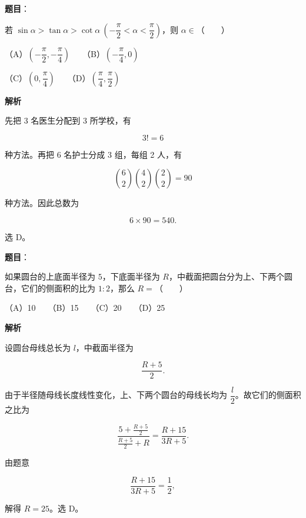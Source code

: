\begin{answer}

\textbf{题目}：

若 $\sin\alpha>\tan\alpha>\cot\alpha\ \left(-\dfrac\pi2<\alpha<\dfrac\pi2\right)$，则 $\alpha\in$\mbox{（　　）}

（A）$\left(-\dfrac\pi2,-\dfrac\pi4\right)$　　（B）$\left(-\dfrac\pi4,0\right)$

（C）$\left(0,\dfrac\pi4\right)$　　（D）$\left(\dfrac\pi4,\dfrac\pi2\right)$

\textbf{解析}

先把 3 名医生分配到 3 所学校，有

\nopagebreak[4]
\[
3!=6
\]

种方法。再把 6 名护士分成 3 组，每组 2 人，有

\nopagebreak[4]
\[
\binom62\binom42\binom22=90
\]

种方法。因此总数为

\nopagebreak[4]
\[
6\times90=540.
\]

选 D。


\end{answer}
\begin{answer}

\textbf{题目}：

如果圆台的上底面半径为 $5$，下底面半径为 $R$，中截面把圆台分为上、下两个圆台，它们的侧面积的比为 $1:2$，那么 $R=$\mbox{（　　）}

（A）10　　（B）15　　（C）20　　（D）25

\textbf{解析}

设圆台母线总长为 $l$，中截面半径为

\nopagebreak[4]
\[
\frac{R+5}{2}.
\]

由于半径随母线长度线性变化，上、下两个圆台的母线长均为 $\dfrac l2$。故它们的侧面积之比为

\nopagebreak[4]
\[
\frac{5+\frac{R+5}{2}}{\frac{R+5}{2}+R}
=\frac{R+15}{3R+5}.
\]

由题意

\nopagebreak[4]
\[
\frac{R+15}{3R+5}=\frac12,
\]

解得 $R=25$。选 D。


\end{answer}
